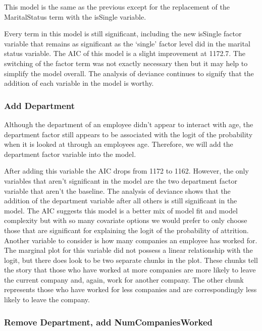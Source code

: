 \documentclass[]{article}
\begin{document}
This model is the same as the previous except for the replacement of the
MaritalStatus term with the isSingle variable.

Every term in this model is still significant, including the new
isSingle factor variable that remains as significant as the `single'
factor level did in the marital status variable. The AIC of this model
is a slight improvement at 1172.7. The switching of the factor term was
not exactly necessary then but it may help to simplify the model
overall. The analysis of deviance continues to signify that the addition
of each variable in the model is worthy.

\hypertarget{add-department}{%
\subsubsection{Add Department}\label{add-department}}

Although the department of an employee didn't appear to interact with
age, the department factor still appears to be associated with the logit
of the probability when it is looked at through an employees age.
Therefore, we will add the department factor variable into the model.

After adding this variable the AIC drops from 1172 to 1162. However, the
only variables that aren't significant in the model are the two
department factor variable that aren't the baseline. The analysis of
deviance shows that the addition of the department variable after all
others is still significant in the model. The AIC suggests this model is
a better mix of model fit and model complexity but with so many
covariate options we would prefer to only choose those that are
significant for explaining the logit of the probability of attrition.
Another variable to consider is how many companies an employee has
worked for. The marginal plot for this variable did not possess a linear
relationship with the logit, but there does look to be two separate
chunks in the plot. These chunks tell the story that those who have
worked at more companies are more likely to leave the current company
and, again, work for another company. The other chunk represents those
who have worked for less companies and are correspondingly less likely
to leave the company.

\hypertarget{remove-department-add-numcompaniesworked}{%
\subsubsection{Remove Department, add
NumCompaniesWorked}\label{remove-department-add-numcompaniesworked}}
\end{document}

